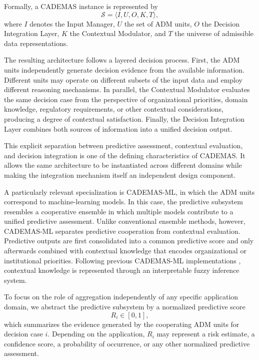 \documentclass[mathematics,article,submit,moreauthors]{Definitions/mdpi}
\begin{document}
Formally, a CADEMAS instance is represented by
\begin{equation}
\mathcal{S}=
\langle I, U, O, K, T \rangle,
\end{equation}
where $I$ denotes the Input Manager, $U$ the set of ADM units, $O$ the
Decision Integration Layer, $K$ the Contextual Modulator, and $T$ the
universe of admissible data representations.

The resulting architecture follows a layered decision process. First,
the ADM units independently generate decision evidence from the
available information. Different units may operate on different subsets
of the input data and employ different reasoning mechanisms. In
parallel, the Contextual Modulator evaluates the same decision case from
the perspective of organizational priorities, domain knowledge,
regulatory requirements, or other contextual considerations, producing a
degree of contextual satisfaction. Finally, the Decision Integration
Layer combines both sources of information into a unified decision
output.

This explicit separation between predictive assessment, contextual
evaluation, and decision integration is one of the defining
characteristics of CADEMAS. It allows the same architecture to be
instantiated across different domains while making the integration
mechanism itself an independent design component.

A particularly relevant specialization is CADEMAS-ML, in which the ADM
units correspond to machine-learning models. In this case, the
predictive subsystem resembles a cooperative ensemble in which multiple
models contribute to a unified predictive assessment. Unlike
conventional ensemble methods, however, CADEMAS-ML separates predictive
cooperation from contextual evaluation. Predictive outputs are first
consolidated into a common predictive score and only afterwards combined
with contextual knowledge that encodes organizational or institutional
priorities. Following previous CADEMAS-ML implementations
\citep{PerezCanedo2022,PerezCanedo2024,Godz2026}, contextual knowledge
is represented through an interpretable fuzzy inference system.

To focus on the role of aggregation independently of any specific
application domain, we abstract the predictive subsystem by a normalized
predictive score
\begin{equation}
R_i \in [0,1],
\end{equation}
which summarizes the evidence generated by the cooperating ADM units for
decision case $i$. Depending on the application, $R_i$ may represent a
risk estimate, a confidence score, a probability of occurrence, or any
other normalized predictive assessment.
\end{document}

